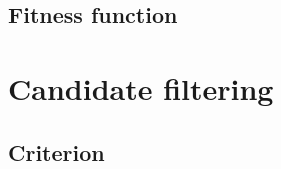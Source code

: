\subsection{Fitness function}




\section{Candidate filtering}\label{sec:theo-rule}

\subsection{Criterion}

